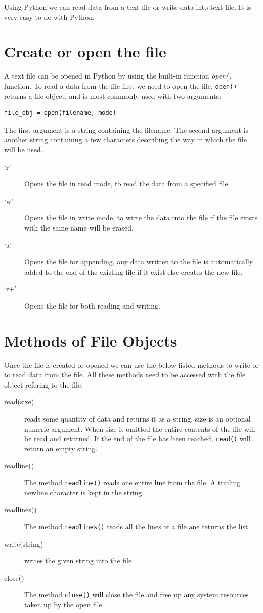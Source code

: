 \documentclass[11pt,a4paper]{article}
\author{TalentSprint}
\date{}
\begin{document}
Using Python we can read data from a text file or write data into text file.
It is very easy to do with Python.

\section*{Create or open the file}

A text file can be opened in Python by using the built-in function \emph{open()} function. To read a data from the file first we need to open the file.
\texttt{open()} returns a file object, and is most commonly used with two arguments:
\begin{verbatim}
file_obj = open(filename, mode)
\end{verbatim}
The first argument is a string containing the filename. The second argument is another string containing a few characters describing the way in which the file will be used.

\begin{description}
\item [`r'] Opens the file in read mode, to read the data from a specified file.
\item [`w'] Opens the file in write mode, to wirte the data into the file if the file exists with the same name will be erased.
\item [`a'] Opens the file for appending, any data written to the file is automatically added to the end of the existing file if it exist else creates the new file.
\item [`r+'] Opens the file for both reading and writing.
\end{description}

\section*{Methods of File Objects}
Once the file is created or opened we can use the below listed methods to write or to read data from the file. All these methods need to be accessed with the file object refering to the file.
\begin{description}
\item [read(size)] reads some quantity of data and returns it as a string. size is an optional numeric argument. When size is omitted the entire contents of the file will be read and returned. If the end of the file has been reached, \texttt{read()} will return an empty string. 
\item [readline()] The method \texttt{readline()} reads one entire line from the file. A trailing newline character is kept in the string.
\item [readlines()] The method \texttt{readlines()} reads all the lines of a file ane returns the list.
\item [write(string)] writes the given string into the file.
\item [close()] The method \texttt{close()} will close the file and free up any system resources taken up by the open file.
\end{description}
\end{document}

